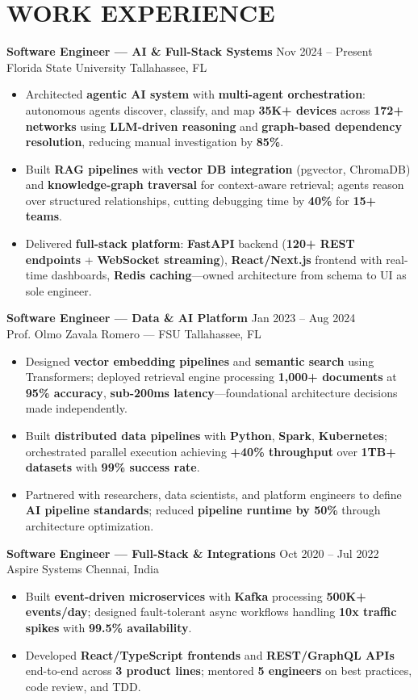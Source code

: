 \documentclass[letterpaper,10pt]{article}
\newcommand{\resumeItem}[1]{\item\small #1}
\newcommand{\resumeSubheading}[4]{
  \vspace{4pt}
  \noindent
  \textbf{#1} \hfill {\footnotesize #2} \\
  [-1pt]
  \noindent
  \small #3 \hfill {\small #4}
  \vspace{2pt}
}
\newcommand{\resumeItemsStart}{\vspace{-2pt}\begin{itemize}}
\newcommand{\resumeItemsEnd}{\end{itemize}\vspace{4pt}}
\begin{document}
\section{\textcolor{metablue}{WORK EXPERIENCE}}
\vspace{-12pt}

\resumeSubheading
{Software Engineer --- AI \& Full-Stack Systems}{Nov 2024 -- Present}
{Florida State University}{Tallahassee, FL}
\resumeItemsStart
\resumeItem{Architected \textbf{agentic AI system} with \textbf{multi-agent orchestration}: autonomous agents discover, classify, and map \textbf{35K+ devices} across \textbf{172+ networks} using \textbf{LLM-driven reasoning} and \textbf{graph-based dependency resolution}, reducing manual investigation by \textbf{85\%}.}
\resumeItem{Built \textbf{RAG pipelines} with \textbf{vector DB integration} (pgvector, ChromaDB) and \textbf{knowledge-graph traversal} for context-aware retrieval; agents reason over structured relationships, cutting debugging time by \textbf{40\%} for \textbf{15+ teams}.}
\resumeItem{Delivered \textbf{full-stack platform}: \textbf{FastAPI} backend (\textbf{120+ REST endpoints} + \textbf{WebSocket streaming}), \textbf{React/Next.js} frontend with real-time dashboards, \textbf{Redis caching}---owned architecture from schema to UI as sole engineer.}
\resumeItemsEnd
\vspace{-12pt}

\resumeSubheading
{Software Engineer --- Data \& AI Platform}{Jan 2023 -- Aug 2024}
{Prof. Olmo Zavala Romero --- FSU}{Tallahassee, FL}
\resumeItemsStart
\resumeItem{Designed \textbf{vector embedding pipelines} and \textbf{semantic search} using Transformers; deployed retrieval engine processing \textbf{1,000+ documents} at \textbf{95\% accuracy}, \textbf{sub-200ms latency}---foundational architecture decisions made independently.}
\resumeItem{Built \textbf{distributed data pipelines} with \textbf{Python}, \textbf{Spark}, \textbf{Kubernetes}; orchestrated parallel execution achieving \textbf{+40\% throughput} over \textbf{1TB+ datasets} with \textbf{99\% success rate}.}
\resumeItem{Partnered with researchers, data scientists, and platform engineers to define \textbf{AI pipeline standards}; reduced \textbf{pipeline runtime by 50\%} through architecture optimization.}
\resumeItemsEnd
\vspace{-12pt}

\resumeSubheading
{Software Engineer --- Full-Stack \& Integrations}{Oct 2020 -- Jul 2022}
{Aspire Systems}{Chennai, India}
\resumeItemsStart
\resumeItem{Built \textbf{event-driven microservices} with \textbf{Kafka} processing \textbf{500K+ events/day}; designed fault-tolerant async workflows handling \textbf{10x traffic spikes} with \textbf{99.5\% availability}.}
\resumeItem{Developed \textbf{React/TypeScript frontends} and \textbf{REST/GraphQL APIs} end-to-end across \textbf{3 product lines}; mentored \textbf{5 engineers} on best practices, code review, and TDD.}
\resumeItemsEnd
\vspace{-8pt}
\end{document}
